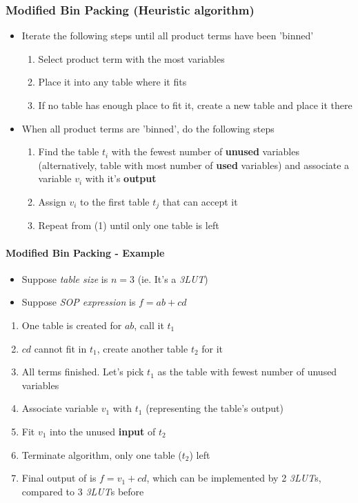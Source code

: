 \documentclass{article}
\begin{document}
\subsubsection{Modified Bin Packing (Heuristic algorithm)}
\begin{itemize}
    \item Iterate the following steps until all product terms have been 'binned'
        \begin{enumerate}
            \item Select product term with the most variables
            \item Place it into any table where it fits
            \item If no table has enough place to fit it, create a new table and place it there
        \end{enumerate}
    \item When all product terms are 'binned', do the following steps
        \begin{enumerate}
            \item Find the table $t_{i}$ with the fewest number of \textbf{unused} variables (alternatively, table with most number of \textbf{used} variables) and associate a variable $v_{i}$ with it's \textbf{output}
            \item Assign $v_{i}$ to the first table $t_{j}$ that can accept it
            \item Repeat from (1) until only one table is left
        \end{enumerate}
\end{itemize}

\paragraph{Modified Bin Packing - Example}\mbox{}
\begin{itemize}
    \item Suppose \textit{table size} is $n = 3$ (ie. It's a \textit{3LUT})
    \item Suppose \textit{SOP expression} is $f = ab + cd$
\end{itemize}

\vspace{0.3cm}
\begin{enumerate}[label*=\arabic*.]
    \item One table is created for $ab$, call it $t_{1}$
    \item $cd$ cannot fit in $t_{1}$, create another table $t_{2}$ for it
    \item All terms finished. Let's pick $t_{1}$ as the table with fewest number of unused variables
    \item Associate variable $v_{1}$ with $t_{1}$ (representing the table's output)
    \item Fit $v_{1}$ into the unused \textbf{input} of $t_{2}$
    \item Terminate algorithm, only one table ($t_{2}$) left
    \item Final output of is $f = v_{1} + cd$, which can be implemented by 2 \textit{3LUT}s, compared to 3 \textit{3LUT}s before
\end{enumerate}
\end{document}
